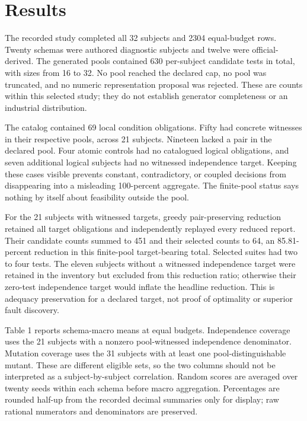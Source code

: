 \documentclass[sigconf,nonacm]{acmart}
\begin{document}
\section{Results}
The recorded study completed all 32 subjects and 2304 equal-budget rows. Twenty schemas were authored diagnostic subjects and twelve were official-derived. The generated pools contained 630 per-subject candidate tests in total, with sizes from 16 to 32. No pool reached the declared cap, no pool was truncated, and no numeric representation proposal was rejected. These are counts within this selected study; they do not establish generator completeness or an industrial distribution.

The catalog contained 69 local condition obligations. Fifty had concrete witnesses in their respective pools, across 21 subjects. Nineteen lacked a pair in the declared pool. Four atomic controls had no catalogued logical obligations, and seven additional logical subjects had no witnessed independence target. Keeping these cases visible prevents constant, contradictory, or coupled decisions from disappearing into a misleading 100-percent aggregate. The finite-pool status says nothing by itself about feasibility outside the pool.

For the 21 subjects with witnessed targets, greedy pair-preserving reduction retained all target obligations and independently replayed every reduced report. Their candidate counts summed to 451 and their selected counts to 64, an 85.81-percent reduction in this finite-pool target-bearing total. Selected suites had two to four tests. The eleven subjects without a witnessed independence target were retained in the inventory but excluded from this reduction ratio; otherwise their zero-test independence target would inflate the headline reduction. This is adequacy preservation for a declared target, not proof of optimality or superior fault discovery.

Table 1 reports schema-macro means at equal budgets. Independence coverage uses the 21 subjects with a nonzero pool-witnessed independence denominator. Mutation coverage uses the 31 subjects with at least one pool-distinguishable mutant. These are different eligible sets, so the two columns should not be interpreted as a subject-by-subject correlation. Random scores are averaged over twenty seeds within each schema before macro aggregation. Percentages are rounded half-up from the recorded decimal summaries only for display; raw rational numerators and denominators are preserved.
\end{document}
